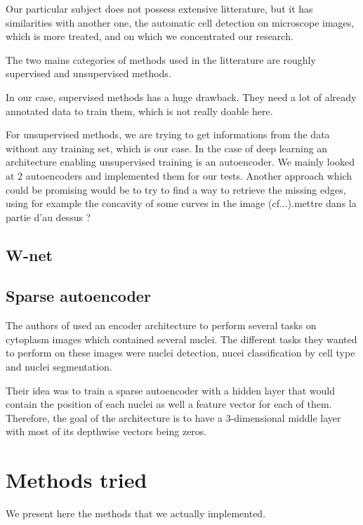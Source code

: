 \documentclass{report}
\begin{document}
Our particular subject does not possess extensive litterature, but it has similarities with another one, the automatic cell detection on microscope images, which is more treated, and on which we concentrated our research.

The two mains categories of methods used in the litterature are roughly supervised and unsupervised methods.  \newline

In our case, supervised methods has a huge drawback. They need a lot of already annotated data to train them, which is not really doable here.  \newline

For unsupervised methods, we are trying to get informations from the data without any training set, which is our case.
In the case of deep learning an architecture enabling unsupervised training is an autoencoder. We mainly looked at 2 autoencoders and implemented them for our tests.\newline\newline
Another approach which could be promising would be to try to find a way to retrieve the missing edges, using for example the concavity of some curves in the image (cf...). mettre dans la partie d'au dessus ?

\section{W-net}

\section{Sparse autoencoder}

The authors of \cite{ref} used an encoder architecture to perform several tasks on cytoplasm images which contained several nuclei.
The different tasks they wanted to perform on these images were nuclei detection, nucei classification by cell type and nuclei segmentation.\newline

Their idea was to train a sparse autoencoder with a hidden layer that would contain the position of each nuclei as well a feature vector for each of them.
Therefore, the goal of the architecture is to have a 3-dimensional middle layer with most of its depthwise vectors being zeros.


\chapter{Methods tried}
We present here the methods that we actually implemented.
\end{document}
